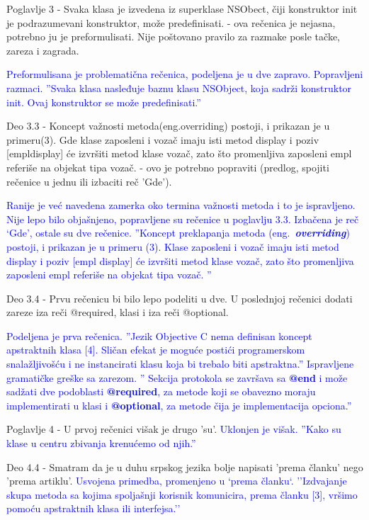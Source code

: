 \documentclass[a4paper]{report}
\newcommand{\odgovor}[1]{\textcolor{blue}{#1}}
\begin{document}
Poglavlje 3 - Svaka klasa je izvedena iz superklase NSObect, \v ciji konstruktor init je podrazumevani konstruktor, mo\v ze predefinisati. - ova re\v cenica je nejasna, potrebno ju je preformulisati. Nije po\v stovano pravilo za razmake posle ta\v cke, zareza i zagrada.

\odgovor{
Preformulisana je problematična rečenica, podeljena je u dve zapravo. Popravljeni razmaci.
''Svaka klasa nasleđuje baznu klasu NSObject, koja sadrži konstruktor init. Ovaj konstruktor se može predefinisati.''
}

Deo 3.3 - Koncept va\v znosti metoda(eng.overriding) postoji, i prikazan je u primeru(3). Gde klase zaposleni i voza\v c imaju isti metod display i poziv [empldisplay] \'ce izvr\v siti metod klase voza\v c, zato \v sto promenljiva zaposleni empl referi\v se na objekat tipa voza\v c. - ovo je potrebno popraviti (predlog, spojiti re\v cenice u jednu ili izbaciti re\v c 'Gde').

\odgovor{
Ranije je već navedena zamerka oko termina važnosti metoda i to je ispravljeno. Nije lepo bilo objašnjeno, popravljene su rečenice u poglavlju 3.3. Izbačena je reč `Gde', ostale su dve rečenice. ''Koncept preklapanja metoda (eng.~\textbf{\em overriding})  postoji, i prikazan je u primeru (3). Klase zaposleni i vozač imaju isti metod display i poziv [empl display] će izvršiti metod klase vozač, zato što promenljiva zaposleni empl referiše na objekat tipa vozač. ''
}

Deo 3.4 - Prvu re\v cenicu bi bilo lepo podeliti u dve. U poslednjoj re\v cenici dodati zareze iza re\v ci @required, klasi i iza re\v ci @optional.

\odgovor{
Podeljena je prva rečenica.
''Jezik Objective C nema definisan koncept apstraktnih klasa [4]. Sličan efekat je moguće postići programerskom snalažljivošću i ne instancirati klasu koja bi trebalo biti apstraktna.''
Ispravljene gramatičke greške sa zarezom.
'' Sekcija protokola se završava sa \textbf{@end} i može sadžati dve podoblasti \textbf{@required}, za metode koji se obavezno moraju implementirati u klasi i \textbf{@optional}, za metode čija je implementacija opciona.''
}

Poglavlje 4 - U prvoj re\v cenici vi\v sak je drugo 'su'.
\odgovor{
Uklonjen je višak. ''Kako su klase u centru zbivanja krenućemo od njih.''
}

Deo 4.4 - Smatram da je u duhu srpskog jezika bolje napisati 'prema \v clanku' nego 'prema artiklu'.
\odgovor{
Usvojena primedba, promenjeno u `prema članku`.  ''Izdvajanje skupa metoda sa kojima spoljašnji korisnik komunicira, prema članku [3], vršimo pomoću apstraktnih klasa ili interfejsa.''
}
\end{document}
